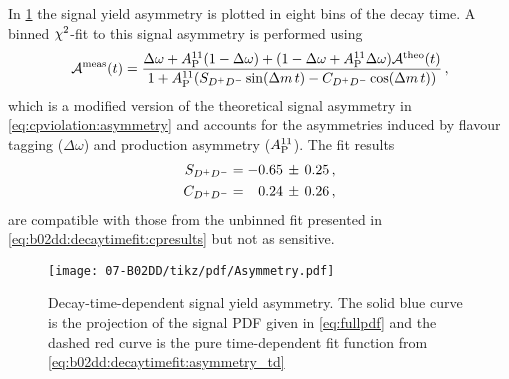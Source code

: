 
In \cref{fig:b02dd:decaytimefit:asymmetry} the signal yield asymmetry is
plotted in eight bins of the decay time. A binned $\chi^2$-fit to this signal
asymmetry is performed using
\begin{align}
{\mathcal A}^{\text{meas}}(t) = \frac{\Delta\omega + A_\text{P}^{11}(1 - \Delta\omega) + (1 - \Delta\omega + A_\text{P}^{11}\Delta\omega){\mathcal A}^{\text{theo}}(t)}{1 + A_\text{P}^{11}(S_{{{D}^+}{{D}^-}} \sin({\Delta m}\,t) - C_{{{D}^+}{{D}^-}} \cos({\Delta m}\,t))}\,,
\label{eq:b02dd:decaytimefit:asymmetry_td}
\end{align}
which is a modified version of the theoretical signal asymmetry in
\cref{eq:cpviolation:asymmetry} and accounts for the asymmetries induced by
flavour tagging ($\Delta\omega$) and production asymmetry ($A_\text{P}^{11}$).
The fit results
\begin{align*}
\begin{split}
  S_{{{D}^+}{{D}^-}}                &= -0.65\,\pm\,0.25 \,, \\
  C_{{{D}^+}{{D}^-}}                &= \phantom{-}0.24\,\pm\,0.26 \,,
\end{split}
\end{align*}
are compatible with those from the unbinned fit presented in
\cref{eq:b02dd:decaytimefit:cpresults} but not as sensitive.
\begin{figure}[htb]
\centering
\texttt{[image: 07-B02DD/tikz/pdf/Asymmetry.pdf]}
\caption{Decay-time-dependent signal yield asymmetry. The solid blue curve is the
projection of the signal PDF given in \cref{eq:fullpdf} and the dashed red curve is the
pure time-dependent fit function from
\cref{eq:b02dd:decaytimefit:asymmetry_td}}
\label{fig:b02dd:decaytimefit:asymmetry}
\end{figure}

\FloatBarrier
